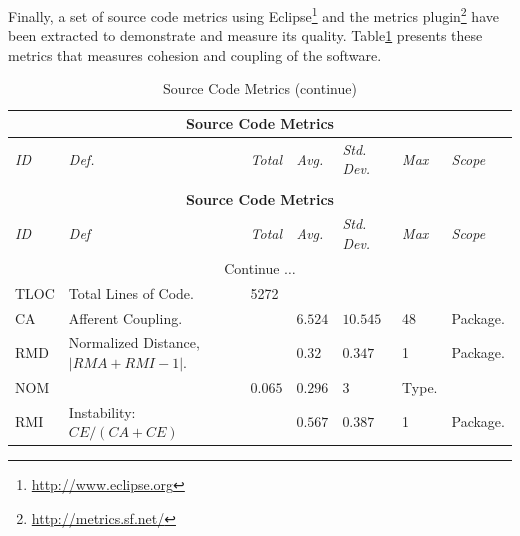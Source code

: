 Finally, a set of source code metrics using Eclipse\footnote{\url{http://www.eclipse.org}} and the 
metrics plugin\footnote{\url{http://metrics.sf.net/}} have been extracted to demonstrate and measure its 
quality. Table\ref{tabla:metricas-valores} presents these metrics that measures cohesion and coupling 
of the software.
   \begin{longtable}{|p{1cm}|p{4cm}|p{1cm}|p{1cm}|p{1cm}|p{1cm}|p{1.5cm}|}
        
        \caption{Source Code Metrics} \label{tabla:metricas-valores}\\
        \hline
        \multicolumn{7}{|c|}{\textbf{Source Code Metrics}}\\
        \hline
        \textit{ID} &  \textit{Def.} &  \textit{Total} &  \textit{Avg.}& 
\textit{Std. Dev.} & \textit{Max}& \textit{Scope} \\ \hline
        \endfirsthead
        \caption[]{Source Code Metrics (continue)}\\
        \hline
        \multicolumn{7}{|c|}{\textbf{Source Code Metrics}}\\
        \hline
        \textit{ID} & \textit{Def} & \textit{Total} &  \textit{Avg.}& 
\textit{Std.
        Dev.} & \textit{Max}& \textit{Scope} \\ \hline
        \endhead
        \hline
        \multicolumn{7}{|c|}{Continue $\ldots$}\\
        \hline
        \endfoot
        \hline
        \endlastfoot
		TLOC&Total Lines of Code.&5272&&&& \\ \hline
    		CA&Afferent Coupling.&&$6.524$&$10.545$&48&Package.\\ \hline
		RMD&Normalized Distance, $|RMA + RMI - 1 |$.&&$0.32$&$0.347$&1&Package. \\ \hline
		NOM&&$0.065$&$0.296$&3&Type. \\ \hline 
		RMI&Instability: $CE / (CA + CE)$&&$0.567$&$0.387$&1&Package. \\ \hline

\end{longtable}
